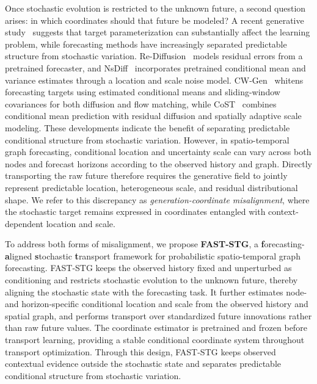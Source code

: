 \documentclass[sigconf, anonymous, review]{acmart}
\begin{document}
Once stochastic evolution is restricted to the unknown future, a second
question arises: in which coordinates should that future be modeled? A recent generative study~\cite{li2026backtobasics} suggests that target
parameterization can substantially affect the learning problem,
while forecasting methods have increasingly separated predictable
structure from stochastic variation. Re-Diffusion~\cite{zhang2026rediffusion} models residual errors from a pretrained forecaster, and
NsDiff~\cite{ye2025nsdiff} incorporates pretrained conditional mean and variance estimates
through a location and scale noise model. CW-Gen~\cite{yang2026cwgen} whitens forecasting targets using estimated conditional means and
sliding-window covariances for both diffusion and flow matching, while CoST~\cite{sheng2026cost} combines conditional mean prediction
with residual diffusion and spatially adaptive scale modeling. These developments indicate the benefit of
separating predictable conditional structure from stochastic variation.
However, in spatio-temporal graph forecasting, conditional location and
uncertainty scale can vary across both nodes and forecast horizons
according to the observed history and graph. Directly transporting the
raw future therefore requires the generative field to jointly represent
predictable location, heterogeneous scale, and residual distributional
shape. We refer to this discrepancy as
\emph{generation-coordinate misalignment}, where the stochastic target
remains expressed in coordinates entangled with context-dependent
location and scale.

To address both forms of misalignment, we propose
\textbf{FAST-STG}, a \textbf{f}orecasting-\textbf{a}ligned
\textbf{s}tochastic \textbf{t}ransport framework for probabilistic
spatio-temporal graph forecasting. FAST-STG keeps the observed history
fixed and unperturbed as conditioning and restricts stochastic evolution
to the unknown future, thereby aligning the stochastic state with the
forecasting task. It further estimates node- and horizon-specific
conditional location and scale from the observed history and spatial
graph, and performs transport over standardized future innovations
rather than raw future values. The coordinate estimator is pretrained
and frozen before transport learning, providing a stable conditional
coordinate system throughout transport optimization. Through this
design, FAST-STG keeps observed contextual evidence outside the
stochastic state and separates predictable conditional structure from
stochastic variation.
\end{document}
